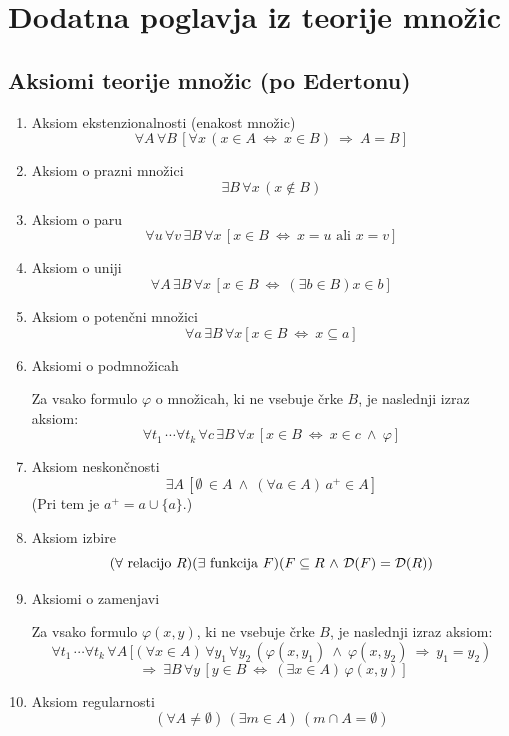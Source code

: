 \documentclass[11pt,paper=b5,DIV=13,headinclude,footinclude]{scrbook}
\def\inn {{~\wedge~}}
\def\sledi {{~\Rightarrow~}}
\def\cee {{~\Leftrightarrow~}}
\begin{document}
\chapter{Dodatna poglavja iz teorije množic}


\section{Aksiomi teorije množic (po Edertonu)}

\begin{enumerate}
  \item Aksiom ekstenzionalnosti (enakost množic)
  $$\forall A\, \forall B\, [\forall x \,(x\in A \cee x\in B) \sledi A = B]$$
  
  \item Aksiom o prazni množici
  $$\exists B\, \forall x\, (x\not \in B)$$

  \item Aksiom o paru
    $$\forall u\, \forall v\, \exists B\, \forall x\, [x\in B \cee x = u\textrm{ ali }x = v]$$

  \item Aksiom o uniji
    $$\forall A\, \exists B\, \forall x\, [x\in B \cee (\exists b\in B) x\in b]$$

  \item Aksiom o potenčni množici  
    $$\forall a\, \exists B\, \forall x [x\in B \cee x\subseteq a]$$

  \item Aksiomi o podmnožicah
   
  Za vsako formulo $\varphi$ o množicah, ki ne vsebuje črke $B$, 
  je naslednji izraz aksiom:  
$$\forall t_1\,\cdots \forall t_k\,\forall c\,\exists B \,\forall x \,[x\in B \cee x\in c \inn \varphi]$$

  \item Aksiom neskončnosti
$$\exists A\,[\emptyset \,\in A \inn (\forall a\in A)\, a^+\in A]$$
(Pri tem je $a^+ = a\cup \{a\}$.)

\item Aksiom izbire
$$(\forall \textrm{ relacijo }R)(\exists \textrm{ funkcija }F)(F\subseteq R \inn {\cal D}(F) = {\cal D}(R))$$

\item Aksiomi o zamenjavi 

Za vsako formulo $\varphi(x,y)$, ki ne vsebuje črke $B$, 
je naslednji izraz aksiom:
$$\forall t_1\,\cdots \forall t_k\,\forall A\,[(\forall x\in A)\,\forall y_1\, \forall y_2\, (\varphi(x,y_1) \inn \varphi(x,y_2) \sledi y_1 = y_2)$$
$$\sledi \exists B\, \forall y\, [y\in B \cee (\exists x\in A)\,\varphi(x,y)]$$

\item Aksiom regularnosti
$$(\forall A\neq \emptyset)\,(\exists m\in A)\,(m\cap A = \emptyset)$$
\end{enumerate}
\end{document}
